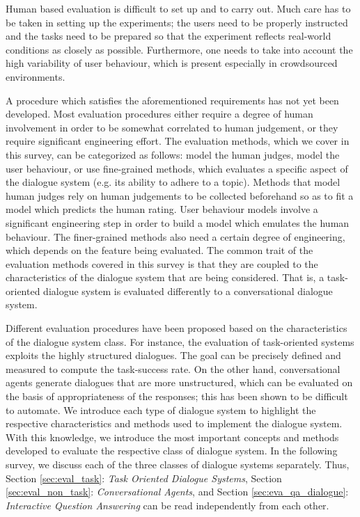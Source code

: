 Human based evaluation is difficult to set up and to carry out. Much care has to be taken in setting up the experiments; the users need to be properly instructed and the tasks need to be prepared so that the experiment reflects real-world conditions as closely as possible. Furthermore, one needs to take into account the high variability of user behaviour, which is present especially in crowdsourced environments.

A procedure which satisfies the aforementioned requirements has not yet been developed. Most evaluation procedures either require a degree of human involvement in order to be somewhat correlated to human judgement, or they require significant engineering effort. The evaluation methods, which we cover in this survey, can be categorized as follows: model the human judges, model the user behaviour, or use fine-grained methods, which evaluates a specific aspect of the dialogue system (e.g. its ability to adhere to a topic). Methods that model human judges rely on human judgements to be collected beforehand so as to fit a model which predicts the human rating. User behaviour models involve a significant engineering step in order to build a model which emulates the human behaviour. The finer-grained methods also need a certain degree of engineering, which depends on the feature being evaluated. The common trait of the evaluation methods covered in this survey is that they are coupled to the characteristics of the dialogue system that are being considered. That is, a task-oriented dialogue system is evaluated differently to a conversational dialogue system.

Different evaluation procedures have been proposed based on the characteristics of the dialogue system class. For instance, the evaluation of task-oriented systems exploits the highly structured dialogues. The goal can be precisely defined and measured to compute the task-success rate. On the other hand, conversational agents generate dialogues that are more unstructured, which can be evaluated on the basis of appropriateness of the responses; this has been shown to be difficult to automate. 
We introduce each type of dialogue system to highlight the respective characteristics and methods used to implement the dialogue system. With this knowledge, we introduce the most important concepts and methods developed to evaluate the respective class of dialogue system. In the following survey, we discuss each of the three classes of dialogue systems separately. Thus, Section \ref{sec:eval_task}:  \emph{Task Oriented Dialogue Systems}, Section \ref{sec:eval_non_task}: \emph{Conversational Agents}, and Section \ref{sec:eva_qa_dialogue}: \emph{Interactive Question Answering} can be read independently from each other.

